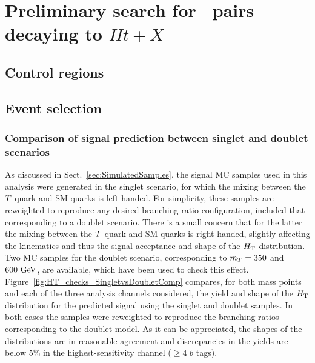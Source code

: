 \clearpage{\pagestyle{empty}\cleardoublepage}

\chapter{Preliminary search  for \TTbar\ pairs decaying to $Ht+X$}\label{chap:htx}



\section{Control regions}\label{sec:htxCR}

\section{Event selection}\label{sec:htxEVT}

\subsection{Comparison of signal prediction between singlet and doublet scenarios}
\label{sec:SingletvsDoublet}

As discussed in Sect.~\ref{sec:SimulatedSamples}, the signal MC samples used in this analysis were
generated in the singlet scenario, for which the mixing between the $\T$ quark and SM quarks is left-handed.
For simplicity, these samples are reweighted to reproduce any desired branching-ratio configuration, included
that corresponding to a doublet scenario. There is a small concern that for the latter the mixing between the $\T$
quark and SM quarks is right-handed, slightly affecting the kinematics and thus the signal acceptance and shape
of the $\HT$ distribution. Two MC samples for the doublet scenario, corresponding to $m_{\T}=350$ and $600\gev$, are available, which
have been used to check this effect. Figure~\ref{fig:HT_checks_SingletvsDoubletComp} compares, for both mass
points and each of the three analysis channels considered, the yield and shape of the $\HT$ distribution for the 
predicted signal using the singlet and doublet samples. In both cases the samples were reweighted to reproduce
the branching ratios corresponding to the doublet model. As it can be appreciated, the shapes of the distributions
are in reasonable agreement and discrepancies in the yields are below 5\% in the highest-sensitivity channel ($\geq 4$ $b$ tags).

